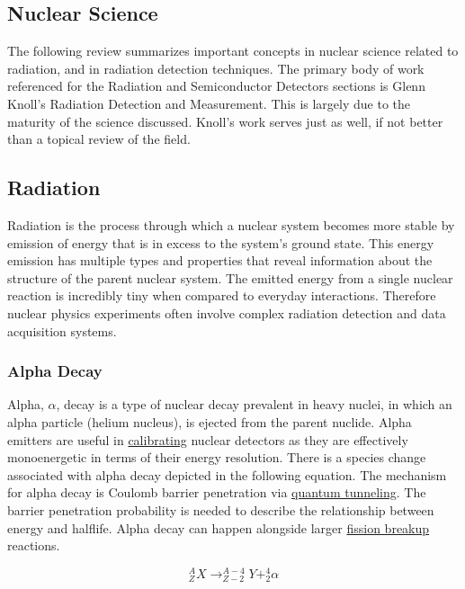 \documentclass[12pt]{article}
\begin{document}
\begin{doublespacing}
\pagebreak
\section{Nuclear Science}
The following review summarizes important concepts in nuclear science related to radiation, and in radiation detection techniques.
The primary body of work referenced for the Radiation and Semiconductor Detectors sections is Glenn Knoll's Radiation Detection and Measurement. \citep{knoll2010radiation}
This is largely due to the maturity of the science discussed. Knoll's work serves just as well, if not better than a topical review of the field.


\subsection{Radiation}
Radiation is the process through which a nuclear system becomes more stable by emission of energy that is in excess to the system's ground state.
This energy emission has multiple types and properties that reveal information about the structure of the parent nuclear system.
The emitted energy from a single nuclear reaction is incredibly tiny when compared to everyday interactions.
Therefore nuclear physics experiments often involve complex radiation detection and data acquisition systems. 

\subsubsection{Alpha Decay}
Alpha, $\alpha$, decay is a type of nuclear decay prevalent in heavy nuclei, in which an alpha particle (helium nucleus), is ejected from the parent nuclide. Alpha emitters are useful in \href{http://cs.smu.ca/~andrew/files/ugthesis/SMU-Thesis-v.1.0.1.pdf}{calibrating} nuclear detectors as they are effectively monoenergetic in terms of their energy resolution. There is a species change associated with alpha decay depicted in the following equation.
The mechanism for alpha decay is Coulomb barrier penetration via \href{https://en.wikipedia.org/wiki/Quantum_tunneling}{quantum tunneling}. The barrier penetration probability is needed to describe the relationship between energy and halflife. Alpha decay can happen alongside larger \href{https://en.wikipedia.org/wiki/Nuclear_fission}{fission breakup} reactions.

\begin{equation} \label{alphaDecayEqn}
^A_Z X \rightarrow ^{A-4}_{Z-2}Y + ^4_2 \alpha
\end{equation}


\end{doublespacing}
\end{document}
